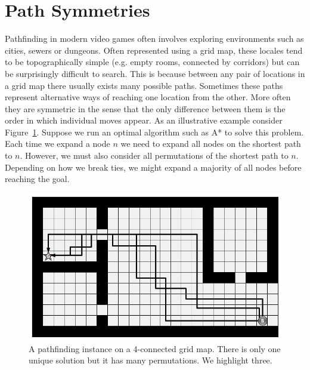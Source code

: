 
\section{Path Symmetries}
Pathfinding in modern video games often involves exploring 
environments such as cities, sewers or dungeons. Often represented using a
grid map, these locales tend to be topographically simple (e.g. empty rooms, 
connected by corridors) but can be surprisingly difficult to search. 
This is because between any pair of locations in a grid map 
there usually exists many possible paths. Sometimes these paths represent 
alternative ways of reaching one location from the other. More often they 
are symmetric in the sense that the only difference between them is the order
in which individual moves appear. 
As an illustrative example consider Figure~\ref{fig::rsr::symmetry}. 
Suppose we run an optimal algorithm such as A* to solve this problem. 
Each time we expand a node $n$ we need to expand all nodes on the shortest path to $n$.
However, we must also consider all permutations of the shortest path to $n$.
Depending on how we break ties, we might expand a majority of all nodes before 
reaching the goal.

\begin{figure}[tb]
\begin{center}
\includegraphics[scale=0.30, trim = 10mm 10mm 10mm 0mm]{chapter_rsr/diagrams/symmetry.png}
\end{center}
\vspace{-3pt}
\caption[An example of path symmetry]{
\small
A pathfinding instance on a 4-connected grid map. There is only 
one unique solution but it has many permutations. We highlight three.}
\label{fig::rsr::symmetry}
\end{figure}

